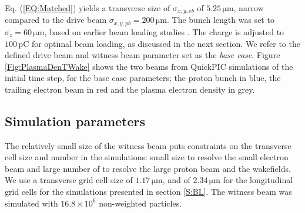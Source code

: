 \documentclass[aps,prstab,reprint,amsmath,amssymb,groupedaddress]{revtex4-1}
\newcommand{\unit}[1]{\,\mathrm{#1}}
\newcommand{\nexp}[1]{\times 10^{#1}}
\begin{document}
Eq. (\ref{EQ:Matched}) yields a transverse size of $\sigma_{x,y,eb}$ of $5.25\unit{\mu m}$, narrow compared to the drive
beam $\sigma_{x,y,pb} = 200\unit{\mu m}$. The bunch length was set to $\sigma_{z}=60\unit{\mu m}$, based on earlier beam
loading studies \cite{berglyd_olsen:2016}. The charge is adjusted to $100\unit{pC}$ for optimal beam loading, as
discussed in the next section. We refer to the defined drive beam and witness beam parameter set as the
\emph{base case}.
Figure \ref{Fig:PlasmaDenTWake} shows the two beams from QuickPIC simulations of the initial time step, for the base
case parameters; the proton bunch in blue, the trailing electron beam in red and the plasma electron density in grey. 



\subsection{Simulation parameters}\label{SIM}

The relatively small size of the witness beam puts constraints on the transverse cell size and number in the
simulations: small size to resolve the small electron beam and large number of to resolve the large proton beam and the
wakefields. %
We use a transverse grid cell size of $1.17\unit{\mu m}$, and of $2.34\unit{\mu m}$ for the longitudinal grid cells for
the simulations presented in section \ref{S:BL}. The witness beam was simulated with $16.8\nexp{6}$ non-weighted
particles.
\end{document}
